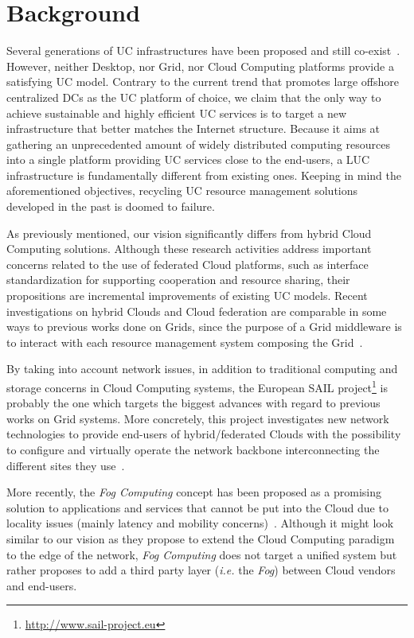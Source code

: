 \section{Background\label{sec:background}}

Several generations of UC infrastructures have been proposed and still
co-exist~\cite{foster:2011}. However, neither Desktop, nor Grid, nor Cloud Computing
platforms provide a satisfying UC model.  Contrary to the current trend that promotes
large offshore centralized DCs as the UC platform of choice, we claim that the only way to
achieve sustainable and highly efficient UC services is to target a new infrastructure
that better matches the Internet structure.  Because it aims at gathering an unprecedented
amount of widely distributed computing resources into a single platform providing UC
services close to the end-users, a LUC infrastructure is fundamentally different from
existing ones.  Keeping in mind the aforementioned objectives, recycling UC resource
management solutions developed in the past is doomed to failure.

As previously mentioned, our vision significantly differs from hybrid Cloud Computing
solutions.  Although these research activities address important concerns related to the
use of federated Cloud platforms, such as interface standardization for
supporting cooperation and resource sharing, their propositions are
incremental improvements of existing UC models. Recent investigations on hybrid Clouds and
Cloud federation are comparable in some ways to previous works done on
Grids, since the purpose of a Grid middleware is to interact with each
resource management system composing the Grid~\cite{buyya:2010,rochwerger:2009,zhao:2012}.

By taking into account network issues, in
addition to traditional computing and storage concerns in Cloud Computing systems, the
European SAIL
project\footnote{\href{http://www.sail-project.eu}{\url{http://www.sail-project.eu}}} is
probably the one which targets the biggest advances with regard to previous works on
Grid systems. More concretely, this project investigates new network
technologies to
provide end-users of hybrid/federated Clouds with the possibility to configure and
virtually operate the network backbone interconnecting the different sites they
use~\cite{sail:2012}.

More recently, the \emph{Fog Computing} concept has been proposed
as a promising solution to applications and services that
cannot be put into the Cloud due to locality issues (mainly latency and
mobility concerns)~\cite{bonomi:2012}.  Although it might look similar to our vision as they
propose to extend the Cloud Computing paradigm to the edge of the network,
\emph{Fog Computing} does not target a unified system but rather proposes to
add a third party layer (\textit{i.e.} the \emph{Fog}) between Cloud vendors and
end-users.

